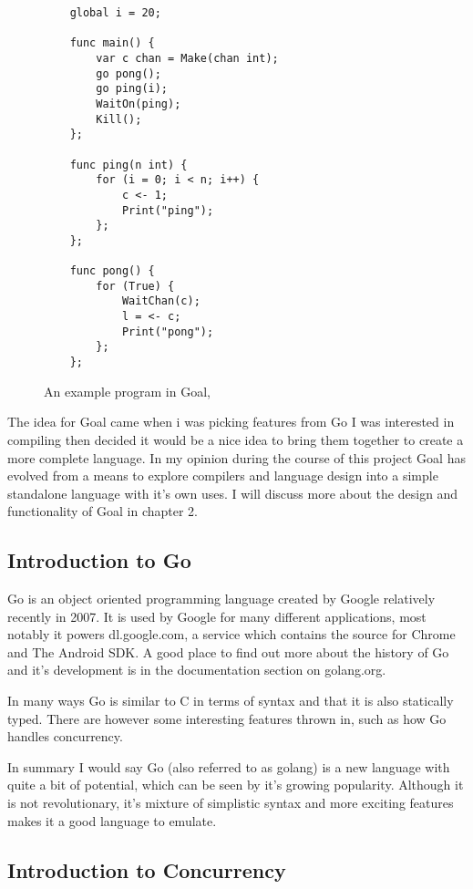 \begin{figure}[h]
\begin{lstlisting}
	global i = 20;
	
	func main() { 
	    var c chan = Make(chan int);
	    go pong();
	    go ping(i);
	    WaitOn(ping);
	    Kill();
	};
	
	func ping(n int) {
	    for (i = 0; i < n; i++) {
	        c <- 1;
	        Print("ping");
	    };    
	};
	
	func pong() {
	    for (True) {
	        WaitChan(c);
	        l = <- c;
	        Print("pong");
	    };    
	};
\end{lstlisting}
\caption{An example program in Goal, }
\label{fig:goalExample} 
\end{figure}

The idea for Goal came when i was picking features from Go I was interested in compiling then decided it would be a nice idea to bring them together to create a more complete language. In my opinion during the course of this project Goal has evolved from a means to explore compilers and language design into a simple standalone language with it's own uses. I will discuss more about the design and functionality of Goal in chapter 2.


\subsection{Introduction to Go}

Go is an object oriented programming language created by Google relatively recently in 2007. It is used by Google for many different applications, most notably it powers dl.google.com, a service which contains the source for Chrome and The Android SDK. A good place to find out more about the history of Go and it's development is in the documentation section on golang.org.

In many ways Go is similar to C in terms of syntax and that it is also statically typed. There are however some interesting features thrown in, such as how Go handles concurrency.

In summary I would say Go (also referred to as golang) is a new language with quite a bit of potential, which can be seen by it's growing popularity. Although it is not revolutionary, it's mixture of simplistic syntax and more exciting features makes it a good language to emulate.

\subsection{Introduction to Concurrency}

